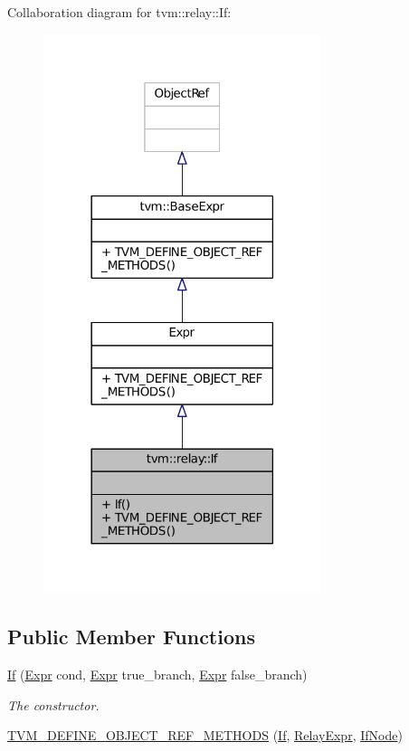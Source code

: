Collaboration diagram for tvm\+:\+:relay\+:\+:If\+:
\nopagebreak
\begin{figure}[H]
\begin{center}
\leavevmode
\includegraphics[width=230pt]{classtvm_1_1relay_1_1If__coll__graph}
\end{center}
\end{figure}
\subsection*{Public Member Functions}
\begin{DoxyCompactItemize}
\item 
\hyperlink{classtvm_1_1relay_1_1If_a57cce7948a3aa126a6e369b8150e6ccf}{If} (\hyperlink{namespacetvm_1_1relay_a5b84e3790f89bb3fad5c7911eeb99531}{Expr} cond, \hyperlink{namespacetvm_1_1relay_a5b84e3790f89bb3fad5c7911eeb99531}{Expr} true\+\_\+branch, \hyperlink{namespacetvm_1_1relay_a5b84e3790f89bb3fad5c7911eeb99531}{Expr} false\+\_\+branch)
\begin{DoxyCompactList}\small\item\em The constructor. \end{DoxyCompactList}\item 
\hyperlink{classtvm_1_1relay_1_1If_a834f376a3f50f59d65ac1f243443ce10}{T\+V\+M\+\_\+\+D\+E\+F\+I\+N\+E\+\_\+\+O\+B\+J\+E\+C\+T\+\_\+\+R\+E\+F\+\_\+\+M\+E\+T\+H\+O\+DS} (\hyperlink{classtvm_1_1relay_1_1If}{If}, \hyperlink{classtvm_1_1RelayExpr}{Relay\+Expr}, \hyperlink{classtvm_1_1relay_1_1IfNode}{If\+Node})
\end{DoxyCompactItemize}


